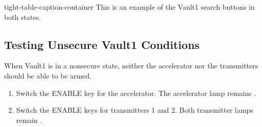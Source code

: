 \documentclass[letterpaper,10pt,english]{sphinxmanual}
\begin{document}
\begin{sphinxuseclass}{tight-table-caption-container}
\sphinxAtStartPar
{} This is an example of the Vault\sphinxhyphen{}1 search buttons in both states.

\end{sphinxuseclass}

\subsection{Testing Unsecure Vault\sphinxhyphen{}1 Conditions}
\label{\detokenize{testing_documentation/Vault-1_ionizing_radiation:testing-unsecure-vault-1-conditions}}
\sphinxAtStartPar
When Vault\sphinxhyphen{}1 is in a non\sphinxhyphen{}secure state, neither the accelerator nor the transmitters should be able to be armed.
\begin{enumerate}
%
\item {} 
\sphinxAtStartPar
Switch the ENABLE key for the accelerator.
The accelerator lamp remains .

\item {} 
\sphinxAtStartPar
Switch the ENABLE keys for transmitters 1 and 2.
Both transmitter lamps remain .

\end{enumerate}
\end{document}
